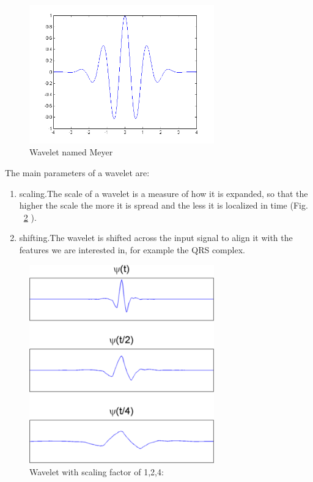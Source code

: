 \documentclass[LaM,binding=0.6cm]{sapthesis}
\begin{document}
\begin{figure}[H]  \centering
	\includegraphics[width=80mm,scale=0.7]{waveletexample.png}
	\caption{Wavelet named Meyer}
	\label{fig:we}
\end{figure}
The main parameters of a wavelet are:
\begin{enumerate}
\item scaling.The scale of a wavelet is a measure of how it is expanded, so that the higher the scale the more it is spread and the less it is localized in time (Fig. ~\ref{fig:ws} ).
\item shifting.The wavelet is shifted across the input signal to align it with the features we are interested in, for example the QRS complex.
\end{enumerate}
\begin{figure}[H]  \centering
	\includegraphics[width=80mm,scale=0.7]{wavescale.png}
	\caption{Wavelet with scaling factor of 1,2,4: \cite{matdwt} }
	\label{fig:ws}
\end{figure}
\end{document}
